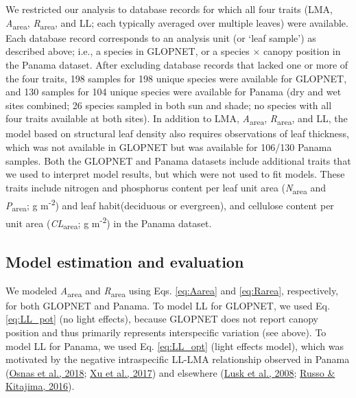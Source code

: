 \documentclass[
  12pt,
  a4paper,
,tablecaptionabove
]{scrartcl}
\begin{document}
We restricted our analysis to database records for which all four traits
(LMA, \emph{A}\textsubscript{area}, \emph{R}\textsubscript{area}, and
LL; each typically averaged over multiple leaves) were available. Each
database record corresponds to an analysis unit (or `leaf sample') as
described above; i.e., a species in GLOPNET, or a species \(\times\)
canopy position in the Panama dataset. After excluding database records
that lacked one or more of the four traits, 198 samples for 198 unique
species were available for GLOPNET, and 130 samples for 104 unique
species were available for Panama (dry and wet sites combined; 26
species sampled in both sun and shade; no species with all four traits
available at both sites). In addition to LMA,
\emph{A}\textsubscript{area}, \emph{R}\textsubscript{area}, and LL, the
model based on structural leaf density also requires observations of
leaf thickness, which was not available in GLOPNET but was available for
106/130 Panama samples. Both the GLOPNET and Panama datasets include
additional traits that we used to interpret model results, but which
were not used to fit models. These traits include nitrogen and
phosphorus content per leaf unit area (\emph{N}\textsubscript{area} and
\emph{P}\textsubscript{area}; g m\textsuperscript{-2}) and leaf
habit(deciduous or evergreen), and cellulose content per unit area
(\emph{CL}\textsubscript{area}; g m\textsuperscript{-2}) in the Panama
dataset.

\hypertarget{model-estimation-and-evaluation}{%
\subsection{Model estimation and
evaluation}\label{model-estimation-and-evaluation}}

We modeled \emph{A}\textsubscript{area} and \emph{R}\textsubscript{area}
using Eqs. \ref{eq:Aarea} and \ref{eq:Rarea}, respectively, for both
GLOPNET and Panama. To model LL for GLOPNET, we used Eq. \ref{eq:LL_pot}
(no light effects), because GLOPNET does not report canopy position and
thus primarily represents interspecific variation (see above). To model
LL for Panama, we used Eq. \ref{eq:LL_opt} (light effects model), which
was motivated by the negative intraspecific LL-LMA relationship observed
in Panama (\protect\hyperlink{ref-Osnas2018}{Osnas et al., 2018};
\protect\hyperlink{ref-Xu2017}{Xu et al., 2017}) and elsewhere
(\protect\hyperlink{ref-Lusk2008}{Lusk et al., 2008};
\protect\hyperlink{ref-Russo2016}{Russo \& Kitajima, 2016}).
\end{document}
